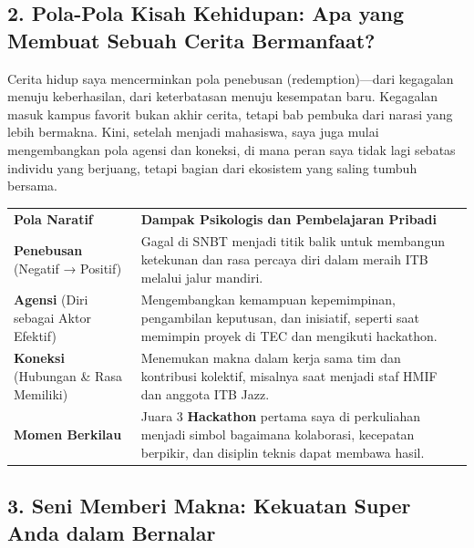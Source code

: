 \documentclass[
  letterpaper,
  DIV=11,
  numbers=noendperiod]{scrreprt}
\begin{document}
\subsection{\texorpdfstring{\textbf{2. Pola-Pola Kisah Kehidupan: Apa
yang Membuat Sebuah Cerita
Bermanfaat?}}{2. Pola-Pola Kisah Kehidupan: Apa yang Membuat Sebuah Cerita Bermanfaat?}}\label{pola-pola-kisah-kehidupan-apa-yang-membuat-sebuah-cerita-bermanfaat}

Cerita hidup saya mencerminkan pola penebusan (redemption)---dari
kegagalan menuju keberhasilan, dari keterbatasan menuju kesempatan baru.
Kegagalan masuk kampus favorit bukan akhir cerita, tetapi bab pembuka
dari narasi yang lebih bermakna. Kini, setelah menjadi mahasiswa, saya
juga mulai mengembangkan pola agensi dan koneksi, di mana peran saya
tidak lagi sebatas individu yang berjuang, tetapi bagian dari ekosistem
yang saling tumbuh bersama.

\begin{longtable}[]{@{}
  >{\raggedright\arraybackslash}p{}
  >{\raggedright\arraybackslash}p{}@{}}
\toprule\noalign{}
\endhead
\bottomrule\noalign{}
\endlastfoot
\textbf{Pola Naratif} & \textbf{Dampak Psikologis dan Pembelajaran
Pribadi} \\
\textbf{Penebusan} (Negatif → Positif) & Gagal di SNBT menjadi titik
balik untuk membangun ketekunan dan rasa percaya diri dalam meraih ITB
melalui jalur mandiri. \\
\textbf{Agensi} (Diri sebagai Aktor Efektif) & Mengembangkan kemampuan
kepemimpinan, pengambilan keputusan, dan inisiatif, seperti saat
memimpin proyek di TEC dan mengikuti hackathon. \\
\textbf{Koneksi} (Hubungan \& Rasa Memiliki) & Menemukan makna dalam
kerja sama tim dan kontribusi kolektif, misalnya saat menjadi staf HMIF
dan anggota ITB Jazz. \\
\textbf{Momen Berkilau} & Juara 3 \textbf{Hackathon} pertama saya di
perkuliahan menjadi simbol bagaimana kolaborasi, kecepatan berpikir, dan
disiplin teknis dapat membawa hasil. \\
\end{longtable}

\subsection{\texorpdfstring{\textbf{3. Seni Memberi Makna: Kekuatan
Super Anda dalam
Bernalar}}{3. Seni Memberi Makna: Kekuatan Super Anda dalam Bernalar}}\label{seni-memberi-makna-kekuatan-super-anda-dalam-bernalar}
\end{document}

